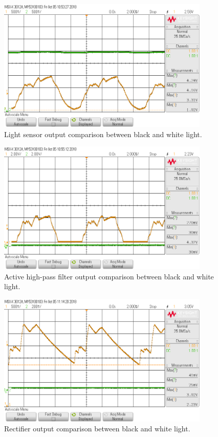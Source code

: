 \begin{figure}[H]
\centering
\includegraphics[width=0.9\textwidth]{figures/Osc-ls.png}
\caption{Light sensor output comparison between black and white light.}
\end{figure}

\begin{figure}[H]
\centering
\includegraphics[width=0.9\textwidth]{figures/Osc-filtergain.png}
\caption{Active high-pass filter output comparison between black and white light.}
\end{figure}

\begin{figure}[H]
\centering
\includegraphics[width=0.9\textwidth]{figures/Osc-rectified.png}
\caption{Rectifier output comparison between black and white light.}
\end{figure}

